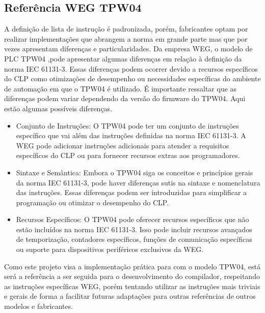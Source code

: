 \subsection{Referência WEG TPW04}

A definição de lista de instrução é padronizada, porém, fabricantes optam por realizar implementações que abrangem a norma em grande parte mas que por vezes apresentam diferenças e particularidades. Da empresa WEG, o modelo de PLC TPW04 \cite{wegtpw04},pode apresentar algumas diferenças em relação à definição da norma IEC 61131-3. Essas diferenças podem ocorrer devido a recursos específicos do CLP como otimizações de desempenho ou necessidades específicas do ambiente de automação em que o TPW04 é utilizado. É importante ressaltar que as diferenças podem variar dependendo da versão do firmware do TPW04. Aqui estão algumas possíveis diferenças.

\begin{itemize}
	\item Conjunto de Instruções: O TPW04 pode ter um conjunto de instruções específico que vai além das instruções definidas na norma IEC 61131-3. A WEG pode adicionar instruções adicionais para atender a requisitos específicos do CLP ou para fornecer recursos extras aos programadores.

	\item Sintaxe e Semântica: Embora o TPW04 siga os conceitos e princípios gerais da norma IEC 61131-3, pode haver diferenças sutis na sintaxe e nomenclatura das instruções. Essas diferenças podem ser introduzidas para simplificar a programação ou otimizar o desempenho do CLP.

	\item Recursos Específicos: O TPW04 pode oferecer recursos específicos que não estão incluídos na norma IEC 61131-3. Isso pode incluir recursos avançados de temporização, contadores específicos, funções de comunicação específicas ou suporte para dispositivos periféricos exclusivos da WEG.
\end{itemize}

Como este projeto visa a implementação prática para com o modelo TPW04, está será a referência a ser seguida para o desenvolvimento do compilador, respeitando as instruções específicas WEG, porém tentando utilizar as instruções mais triviais e gerais de forma a facilitar futuras adaptações para outras referências de outros modelos e fabricantes.


